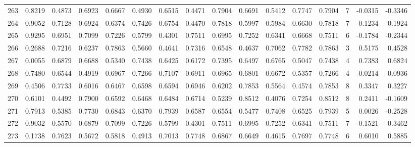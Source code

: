 \begin{tabular}{lrrrrrrrrrrrrrrr}
263 &      0.8219 &  0.4873 &  0.6923 &  0.6667 &  0.4930 &  0.6515 &  0.4471 &  0.7904 &  0.6691 &  0.5412 &   0.7747 &     0.7904 &      7 &                   -0.0315 &                    -0.3346 \\
264 &      0.9052 &  0.7128 &  0.6924 &  0.6374 &  0.7426 &  0.6754 &  0.4470 &  0.7818 &  0.5997 &  0.5984 &   0.6630 &     0.7818 &      7 &                   -0.1234 &                    -0.1924 \\
265 &      0.9295 &  0.6951 &  0.7099 &  0.7226 &  0.5799 &  0.4301 &  0.7511 &  0.6995 &  0.7252 &  0.6341 &   0.6668 &     0.7511 &      6 &                   -0.1784 &                    -0.2344 \\
266 &      0.2688 &  0.7216 &  0.6237 &  0.7863 &  0.5660 &  0.4641 &  0.7316 &  0.6548 &  0.4637 &  0.7062 &   0.7782 &     0.7863 &      3 &                    0.5175 &                     0.4528 \\
267 &      0.0055 &  0.6879 &  0.6688 &  0.5340 &  0.7438 &  0.6425 &  0.6172 &  0.7395 &  0.6497 &  0.6765 &   0.5047 &     0.7438 &      4 &                    0.7383 &                     0.6824 \\
268 &      0.7480 &  0.6544 &  0.4919 &  0.6967 &  0.7266 &  0.7107 &  0.6911 &  0.6965 &  0.6801 &  0.6672 &   0.5357 &     0.7266 &      4 &                   -0.0214 &                    -0.0936 \\
269 &      0.4506 &  0.7733 &  0.6016 &  0.6467 &  0.6598 &  0.6594 &  0.6946 &  0.6202 &  0.7853 &  0.5564 &   0.4574 &     0.7853 &      8 &                    0.3347 &                     0.3227 \\
270 &      0.6101 &  0.4492 &  0.7900 &  0.6592 &  0.6468 &  0.6484 &  0.6714 &  0.5239 &  0.8512 &  0.4076 &   0.7254 &     0.8512 &      8 &                    0.2411 &                    -0.1609 \\
271 &      0.7913 &  0.5385 &  0.7730 &  0.6843 &  0.6370 &  0.7939 &  0.6587 &  0.6554 &  0.5477 &  0.7408 &   0.6525 &     0.7939 &      5 &                    0.0026 &                    -0.2528 \\
272 &      0.9032 &  0.5570 &  0.6879 &  0.7099 &  0.7226 &  0.5799 &  0.4301 &  0.7511 &  0.6995 &  0.7252 &   0.6341 &     0.7511 &      7 &                   -0.1521 &                    -0.3462 \\
273 &      0.1738 &  0.7623 &  0.5672 &  0.5818 &  0.4913 &  0.7013 &  0.7748 &  0.6867 &  0.6649 &  0.4615 &   0.7697 &     0.7748 &      6 &                    0.6010 &                     0.5885 \\

\end{tabular}
